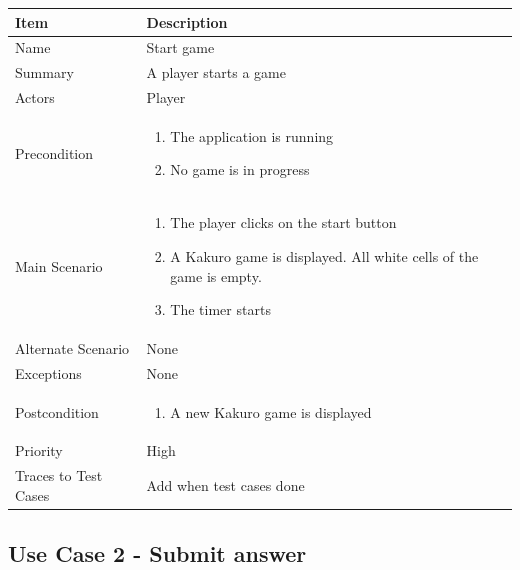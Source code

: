 \documentclass[12pt]{article}
\begin{document}
\begin{center}
\setlength{\tabcolsep}{18pt}
\renewcommand{\arraystretch}{1.1}
\begin{tabular}{ |p{3.4cm}|p{10cm}| }
    \hline
    \textbf{Item} & \textbf{Description} \\
    \hline
    Name & Start game \\
    \hline
    Summary & A player starts a game \\
    \hline
    Actors & Player \\
    \hline
    Precondition &  
    \vspace*{-0.1in}
    \begin{enumerate}[leftmargin=0.2in]
    \item The application is running
    \item No game is in progress
    \end{enumerate}  \\
    \hline
    Main Scenario &     
    \vspace*{-0.1in}
    \begin{enumerate}[leftmargin=0.2in]
    \item The player clicks on the start button
    \item A Kakuro game is displayed. All white cells of the game is empty.
    \item The timer starts
    \end{enumerate}  \\
    \hline
    Alternate Scenario & None  \\
    \hline
    Exceptions & None \\
    \hline
    Postcondition & 
    \vspace*{-0.1in}
    \begin{enumerate}[leftmargin=0.2in]
    \item A new Kakuro game is displayed 
    \end{enumerate}  \\
    \hline
    Priority & High  \\
    \hline
    \small{\small{Traces to Test Cases}} & Add when test cases done  \\
    \hline
\end{tabular}
\end{center}

\newpage


\subsection{Use Case 2 - Submit answer}
\end{document}
